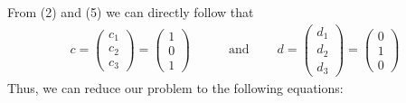 \documentclass{article}
\begin{document}
        From (2) and (5) we can directly follow that
        \begin{align}
            c = \left(\begin{matrix} c_1\\c_2\\c_3 \end{matrix}\right) = \left(\begin{matrix} 1\\0\\1 \end{matrix}\right)\ \ \ \ \ \ \ \ \ \ 
            &\text{and}\ \ \ \ \ \ \ \ \ \ 
            d = \left(\begin{matrix} d_1\\d_2\\d_3 \end{matrix}\right) = \left(\begin{matrix} 0\\1\\0 \end{matrix}\right)
        \end{align}
        Thus, we can reduce our problem to the following equations:
\end{document}
